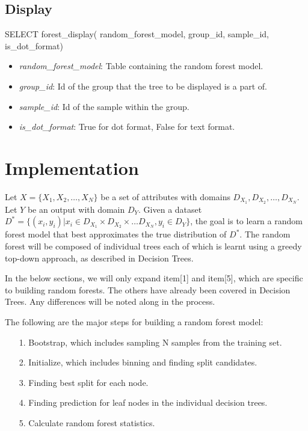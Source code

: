 \subsection{Display} %
\label{sub:display}
\begin{sql}
    SELECT forest_display(
          random_forest_model,
          group_id,
          sample_id,
          is_dot_format)
          
\end{sql}
\begin{itemize}
    \item \emph{random\_forest\_model}: Table containing the random forest model.
    \item \emph{group\_id}: Id of the group that the tree to be displayed is a part of.
    \item \emph{sample\_id}: Id of the sample within the group.
    \item \emph{is\_dot\_format}: True for dot format, False for text format.
\end{itemize}

\section{Implementation} %
\label{sec:implementation}

Let $X = \{X_1, X_2, \dots, X_N\}$ be a set of attributes with domains
$D_{X_1}, D_{X_2}, \dots, D_{X_N}$. Let $Y$ be an output with domain $D_Y$.
Given a dataset $D^* = \{(x_i, y_i) | x_i \in D_{X_1} \times D_{X_2} \times \dots D_{X_N}, y_i \in D_Y\}$,
the goal is to learn a random forest model that best approximates the true
distribution of $D^*$. The random forest will be composed of individual trees
each of which is learnt using a greedy top-down approach, as described in
Decision Trees.

In the below sections, we will only expand item[1] and item[5], which are specific
to building random forests. The others have already been covered in Decision Trees.
Any differences will be noted along in the process.

The following are the major steps for building a random forest model:
\begin{itemize}
\item[1.] Bootstrap, which includes sampling N samples from the training set.
\item[2.] Initialize, which includes binning and finding split candidates.
\item[3.] Finding best split for each node.
\item[4.] Finding prediction for leaf nodes in the individual decision trees.
\item[5.] Calculate random forest statistics.
\end{itemize}

